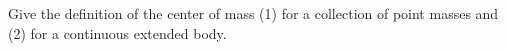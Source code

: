 

\vspace*{\fill}
\centering

Give the definition of the center of mass (1) for a collection of point masses and (2) for a continuous extended body.

\centering
\vspace*{\fill}

